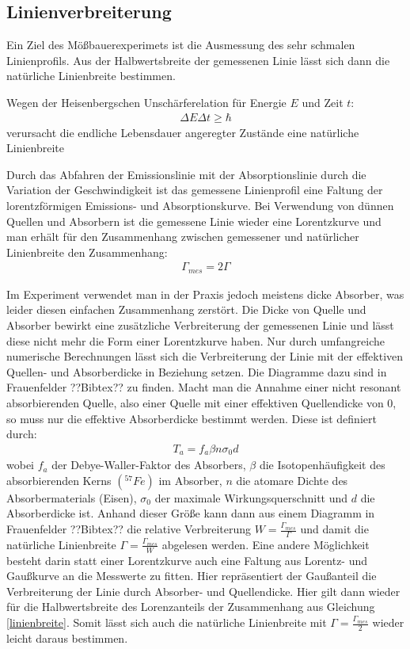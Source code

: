 \documentclass[12pt]{article}
\begin{document}
\subsection{Linienverbreiterung}
Ein Ziel des Mößbauerexperimets ist die Ausmessung des sehr schmalen Linienprofils. Aus der Halbwertsbreite der gemessenen Linie lässt sich dann die natürliche Linienbreite bestimmen.

Wegen der Heisenbergschen Unschärferelation für Energie $E$ und Zeit $t$:
\begin{align}
 \Delta E \Delta t \geq \hbar
\end{align}
verursacht die endliche Lebensdauer angeregter Zustände eine natürliche Linienbreite

Durch das Abfahren der Emissionslinie mit der Absorptionslinie durch die Variation der Geschwindigkeit ist das gemessene Linienprofil eine Faltung der lorentzförmigen
Emissions- und Absorptionskurve. Bei Verwendung von dünnen Quellen und Absorbern ist die gemessene Linie wieder eine Lorentzkurve und man erhält für den Zusammenhang
zwischen gemessener und natürlicher Linienbreite den Zusammenhang:
\begin{align}
 \label{linienbreite}
 \Gamma_{mes} = 2\Gamma
\end{align}

Im Experiment verwendet man in der Praxis jedoch meistens dicke Absorber, was leider diesen einfachen Zusammenhang zerstört. Die Dicke von Quelle und Absorber bewirkt
eine zusätzliche Verbreiterung der gemessenen Linie und lässt diese nicht mehr die Form einer Lorentzkurve haben. Nur durch umfangreiche numerische Berechnungen
lässt sich die Verbreiterung der Linie mit der effektiven Quellen- und Absorberdicke in Beziehung setzen. Die Diagramme dazu sind in Frauenfelder ??Bibtex?? zu finden.
Macht man die Annahme einer nicht resonant absorbierenden Quelle, also einer Quelle mit einer effektiven Quellendicke von 0, so muss nur die effektive Absorberdicke bestimmt
werden. Diese ist definiert durch:
\begin{align}
 T_a = f_a \beta n \sigma_0 d
\end{align}
wobei $f_a$ der Debye-Waller-Faktor des Absorbers, $\beta$ die Isotopenhäufigkeit des absorbierenden Kerns $(^{57}Fe)$ im Absorber, $n$ die atomare Dichte
des Absorbermaterials (Eisen), $\sigma_0$ der maximale Wirkungsquerschnitt und $d$ die Absorberdicke ist. Anhand dieser Größe kann dann aus einem Diagramm in Frauenfelder ??Bibtex??
die relative Verbreiterung $W = \frac{\Gamma_{mes}}{\Gamma}$ und damit die natürliche Linienbreite $\Gamma = \frac{\Gamma_{mes}}{W}$ abgelesen werden.
Eine andere Möglichkeit besteht darin statt einer Lorentzkurve auch eine Faltung aus Lorentz- und Gaußkurve an die Messwerte zu fitten. Hier repräsentiert der Gaußanteil
die Verbreiterung der Linie durch Absorber- und Quellendicke. Hier gilt dann wieder für die Halbwertsbreite des Lorenzanteils der Zusammenhang aus Gleichung \ref{linienbreite}.
Somit lässt sich auch die natürliche Linienbreite mit $\Gamma = \frac{\Gamma_{mes}}{2}$ wieder leicht daraus bestimmen.
\end{document}
